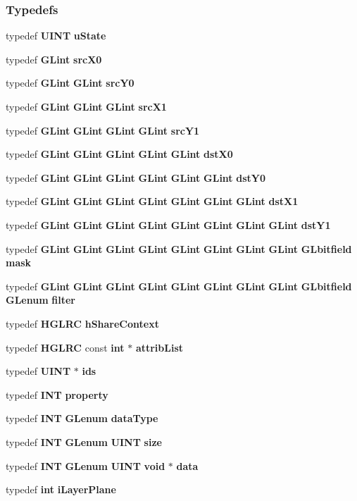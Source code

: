 \subsubsection*{Typedefs}
\begin{DoxyCompactItemize}
\item 
typedef {\bf U\+I\+NT} {\bf u\+State}
\item 
typedef {\bf G\+Lint} {\bf src\+X0}
\item 
typedef {\bf G\+Lint} {\bf G\+Lint} {\bf src\+Y0}
\item 
typedef {\bf G\+Lint} {\bf G\+Lint} {\bf G\+Lint} {\bf src\+X1}
\item 
typedef {\bf G\+Lint} {\bf G\+Lint} {\bf G\+Lint} {\bf G\+Lint} {\bf src\+Y1}
\item 
typedef {\bf G\+Lint} {\bf G\+Lint} {\bf G\+Lint} {\bf G\+Lint} {\bf G\+Lint} {\bf dst\+X0}
\item 
typedef {\bf G\+Lint} {\bf G\+Lint} {\bf G\+Lint} {\bf G\+Lint} {\bf G\+Lint} {\bf G\+Lint} {\bf dst\+Y0}
\item 
typedef {\bf G\+Lint} {\bf G\+Lint} {\bf G\+Lint} {\bf G\+Lint} {\bf G\+Lint} {\bf G\+Lint} {\bf G\+Lint} {\bf dst\+X1}
\item 
typedef {\bf G\+Lint} {\bf G\+Lint} {\bf G\+Lint} {\bf G\+Lint} {\bf G\+Lint} {\bf G\+Lint} {\bf G\+Lint} {\bf G\+Lint} {\bf dst\+Y1}
\item 
typedef {\bf G\+Lint} {\bf G\+Lint} {\bf G\+Lint} {\bf G\+Lint} {\bf G\+Lint} {\bf G\+Lint} {\bf G\+Lint} {\bf G\+Lint} {\bf G\+Lbitfield} {\bf mask}
\item 
typedef {\bf G\+Lint} {\bf G\+Lint} {\bf G\+Lint} {\bf G\+Lint} {\bf G\+Lint} {\bf G\+Lint} {\bf G\+Lint} {\bf G\+Lint} {\bf G\+Lbitfield} {\bf G\+Lenum} {\bf filter}
\item 
typedef {\bf H\+G\+L\+RC} {\bf h\+Share\+Context}
\item 
typedef {\bf H\+G\+L\+RC} const {\bf int} $\ast$ {\bf attrib\+List}
\item 
typedef {\bf U\+I\+NT} $\ast$ {\bf ids}
\item 
typedef {\bf I\+NT} {\bf property}
\item 
typedef {\bf I\+NT} {\bf G\+Lenum} {\bf data\+Type}
\item 
typedef {\bf I\+NT} {\bf G\+Lenum} {\bf U\+I\+NT} {\bf size}
\item 
typedef {\bf I\+NT} {\bf G\+Lenum} {\bf U\+I\+NT} {\bf void} $\ast$ {\bf data}
\item 
typedef {\bf int} {\bf i\+Layer\+Plane}

\end{DoxyCompactItemize}
